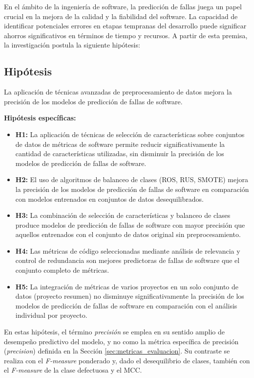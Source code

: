 
En el ámbito de la ingeniería de software, la predicción de fallas juega un papel crucial en la mejora de la calidad y la fiabilidad del software. La capacidad de identificar potenciales errores en etapas tempranas del desarrollo puede significar ahorros significativos en términos de tiempo y recursos. A partir de esta premisa, la investigación postula la siguiente hipótesis:

\subsection*{Hipótesis}

La aplicación de técnicas avanzadas de preprocesamiento de datos mejora la precisión de los modelos de predicción de fallas de software.

\textbf{Hipótesis específicas:}
\begin{itemize}
    \item \textbf{H1:} La aplicación de técnicas de selección de características sobre conjuntos de datos de métricas de software permite reducir significativamente la cantidad de características utilizadas, sin disminuir la precisión de los modelos de predicción de fallas de software.
    \item \textbf{H2:} El uso de algoritmos de balanceo de clases (ROS, RUS, SMOTE) mejora la precisión de los modelos de predicción de fallas de software en comparación con modelos entrenados en conjuntos de datos desequilibrados.
    \item \textbf{H3:} La combinación de selección de características y balanceo de clases produce modelos de predicción de fallas de software con mayor precisión que aquellos entrenados con el conjunto de datos original sin preprocesamiento.
    \item \textbf{H4:} Las métricas de código seleccionadas mediante análisis de relevancia y control de redundancia son mejores predictoras de fallas de software que el conjunto completo de métricas.
    \item \textbf{H5:} La integración de métricas de varios proyectos en un solo conjunto de datos (proyecto resumen) no disminuye significativamente la precisión de los modelos de predicción de fallas de software en comparación con el análisis individual por proyecto.
\end{itemize}

En estas hipótesis, el término \textit{precisión} se emplea en su sentido amplio de desempeño predictivo del modelo, y no como la métrica específica de precisión (\textit{precision}) definida en la Sección \ref{sec:metricas_evaluacion}. Su contraste se realiza con el \textit{F-measure} ponderado y, dado el desequilibrio de clases, también con el \textit{F-measure} de la clase defectuosa y el MCC.

